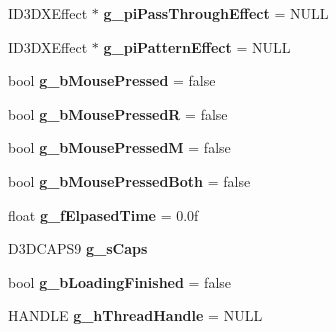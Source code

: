 \begin{DoxyCompactItemize}
\item 
\hypertarget{namespace_assimp_view_a9e1444206a0af0bf1c42f35b7ec19f71}{I\+D3\+D\+X\+Effect $\ast$ {\bfseries g\+\_\+pi\+Pass\+Through\+Effect} = N\+U\+L\+L}\label{namespace_assimp_view_a9e1444206a0af0bf1c42f35b7ec19f71}

\item 
\hypertarget{namespace_assimp_view_afe33ceb66146754a743e9a98023422d7}{I\+D3\+D\+X\+Effect $\ast$ {\bfseries g\+\_\+pi\+Pattern\+Effect} = N\+U\+L\+L}\label{namespace_assimp_view_afe33ceb66146754a743e9a98023422d7}

\item 
\hypertarget{namespace_assimp_view_af750cf0a030fb0b97be1ceae50e6ff72}{bool {\bfseries g\+\_\+b\+Mouse\+Pressed} = false}\label{namespace_assimp_view_af750cf0a030fb0b97be1ceae50e6ff72}

\item 
\hypertarget{namespace_assimp_view_af5dd87460f878b99e5d21ad832e2f13e}{bool {\bfseries g\+\_\+b\+Mouse\+Pressed\+R} = false}\label{namespace_assimp_view_af5dd87460f878b99e5d21ad832e2f13e}

\item 
\hypertarget{namespace_assimp_view_adc85e80270fa582e5791f7529420e54b}{bool {\bfseries g\+\_\+b\+Mouse\+Pressed\+M} = false}\label{namespace_assimp_view_adc85e80270fa582e5791f7529420e54b}

\item 
\hypertarget{namespace_assimp_view_a908795b1f472ef15b866cd88f6195e73}{bool {\bfseries g\+\_\+b\+Mouse\+Pressed\+Both} = false}\label{namespace_assimp_view_a908795b1f472ef15b866cd88f6195e73}

\item 
\hypertarget{namespace_assimp_view_a8d69997bc24f0858ef51f5fc6048a199}{float {\bfseries g\+\_\+f\+Elpased\+Time} = 0.\+0f}\label{namespace_assimp_view_a8d69997bc24f0858ef51f5fc6048a199}

\item 
\hypertarget{namespace_assimp_view_ad1d89505807069af96cb93afb5fa5005}{D3\+D\+C\+A\+P\+S9 {\bfseries g\+\_\+s\+Caps}}\label{namespace_assimp_view_ad1d89505807069af96cb93afb5fa5005}

\item 
\hypertarget{namespace_assimp_view_a079608ef6edc5719c8def7321782aef9}{bool {\bfseries g\+\_\+b\+Loading\+Finished} = false}\label{namespace_assimp_view_a079608ef6edc5719c8def7321782aef9}

\item 
\hypertarget{namespace_assimp_view_aaae641eee491214cd7756861e2d55193}{H\+A\+N\+D\+L\+E {\bfseries g\+\_\+h\+Thread\+Handle} = N\+U\+L\+L}\label{namespace_assimp_view_aaae641eee491214cd7756861e2d55193}


\end{DoxyCompactItemize}
